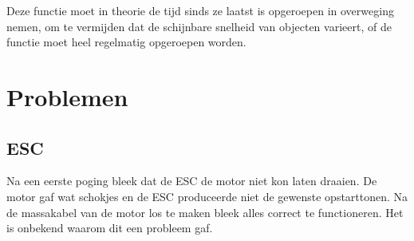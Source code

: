 \documentclass[a4paper, 12pt]{article}
\begin{document}
Deze functie moet in theorie de tijd sinds ze laatst is opgeroepen in overweging
nemen, om te vermijden dat de schijnbare snelheid van objecten varieert,
of de functie moet heel regelmatig opgeroepen worden.

\section{Problemen}
\subsection{ESC}
Na een eerste poging bleek dat de ESC de motor niet kon laten draaien.
De motor gaf wat schokjes en de ESC produceerde niet de gewenste opstarttonen.
Na de massakabel van de motor los te maken bleek alles correct te functioneren.
Het is onbekend waarom dit een probleem gaf.
\end{document}
